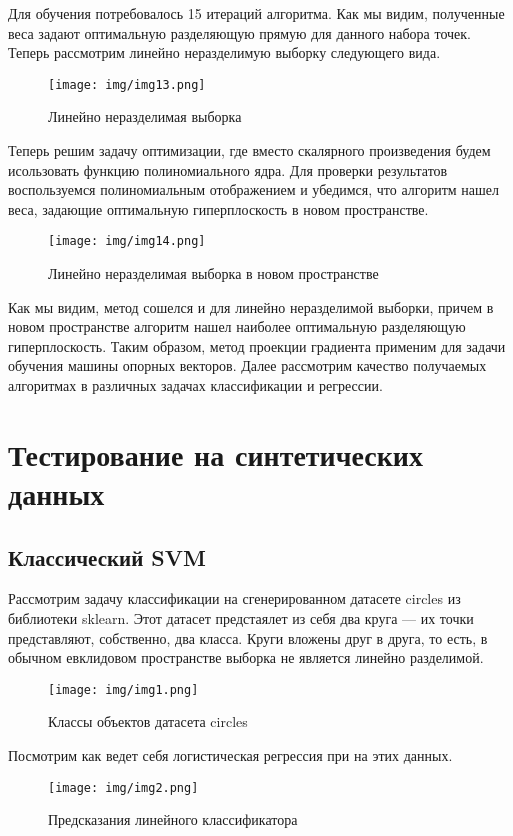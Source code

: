 \documentclass[twoside,twocolumn]{article}
\theoremstyle{plain}
\theoremstyle{definition}
\begin{document}
Для обучения потребовалось 15 итераций алгоритма. Как мы видим, полученные веса задают оптимальную разделяющую прямую для данного набора точек.
Теперь рассмотрим линейно неразделимую выборку следующего вида.
\begin{figure}[!h]
  \caption{Линейно неразделимая выборка}
  \centering
  \texttt{[image: img/img13.png]}
  \label{fig:gd}
\end{figure}
Теперь решим задачу оптимизации, где вместо скалярного произведения будем исользовать функцию полиномиального ядра. Для проверки результатов 
воспользуемся полиномиальным отображением и убедимся, что алгоритм нашел веса, задающие оптимальную гиперплоскость в новом пространстве.
\begin{figure}[!h]
  \caption{Линейно неразделимая выборка в новом пространстве}
  \centering
  \texttt{[image: img/img14.png]}
  \label{fig:gd}
\end{figure}
Как мы видим, метод сошелся и для линейно неразделимой выборки, причем в новом пространстве алгоритм нашел наиболее оптимальную разделяющую гиперплоскость.
Таким образом, метод проекции градиента применим для задачи обучения машины опорных векторов. Далее рассмотрим качество получаемых алгоритмах в различных
задачах классификации и регрессии.

\section{Тестирование на синтетических данных}
\subsection{Классический SVM}
Рассмотрим задачу классификации на сгенерированном датасете circles из библиотеки sklearn. Этот датасет предстаялет из себя два круга — их
точки представляют, собственно, два класса. Круги вложены друг в друга, то есть, в обычном евклидовом пространстве выборка не является линейно
разделимой.
\begin{figure}[!h]
  \caption{Классы объектов датасета circles}
  \centering
  \texttt{[image: img/img1.png]}
  \label{fig:circles}
\end{figure}

Посмотрим как ведет себя логистическая регрессия при на этих данных.

\begin{figure}[!h]
  \caption{Предсказания линейного классификатора}
  \centering
  \texttt{[image: img/img2.png]}
  \label{fig:circles2}
\end{figure}
\end{document}
